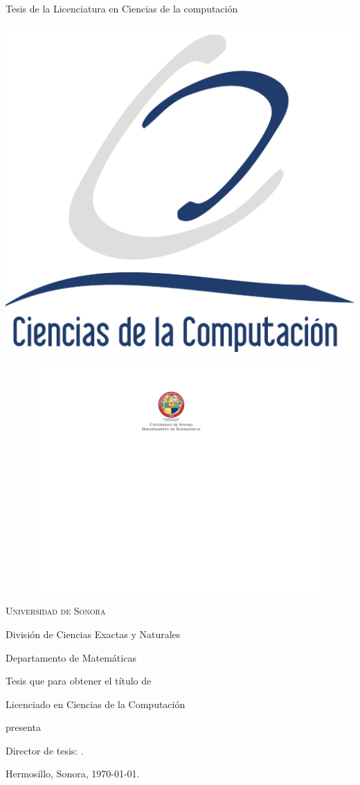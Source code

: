\thispagestyle{empty}

\begin{center}
  {\Large {\sf Tesis de la Licenciatura en Ciencias de la computación}}

  \vspace{5 cm}

  {\Huge \Titulo}

  \vspace{1 cm}
  {\large \Anio}
  \vfill
  \includegraphics[width = .2\textwidth]{tesislcc/logoLCC.png}
\end{center}

\cleardoublepage
\thispagestyle{empty}

\begin{center}
	\begin{figure}[H]
		\centering
        \includegraphics[width = .2\textwidth]{tesislcc/escudoUNISON.pdf}
	\end{figure}
    
    {\Large \textsc{Universidad de Sonora}}
    
    \vspace{-.1 cm}
    
    División de Ciencias Exactas y Naturales
    
    \vspace{-.1 cm}
    
    Departamento de Matemáticas
    
    \vspace{2 cm}
    
    {\bf\Huge \Titulo}
    
    \vspace{2 cm}
    
    {\large Tesis que para obtener el título de}
    
    \vspace{.3 cm}
    
    {\LARGE Licenciado en Ciencias de la Computación}
    
    \vspace{.8 cm}
    
    {\large presenta}
    
    \vspace{.3 cm}
    
    {\Huge \textbf{\Autor}}
    
    \vspace{2 cm}
\end{center}

\begin{flushright}
	Director de tesis: \Director.
    
    Hermosillo, Sonora, \today.
\end{flushright}

\newpage
\thispagestyle{empty}

\newpage

